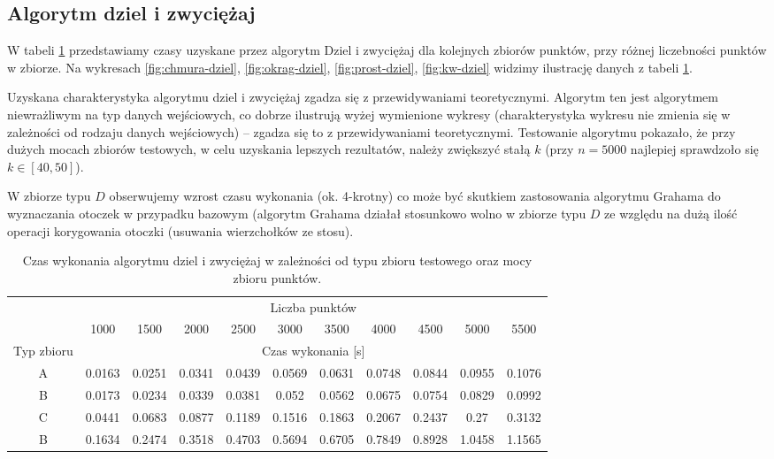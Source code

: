 \documentclass[11pt]{article}
\theoremstyle{remark} \newtheorem{definition}{def.}
\theoremstyle{definition} \newtheorem{twierdzenie}{tw.}
\begin{document}
\subsection{Algorytm dziel i zwyciężaj}

W tabeli \ref{tab:dziel} przedstawiamy czasy uzyskane przez algorytm Dziel i zwyciężaj dla kolejnych zbiorów punktów, przy różnej liczebności punktów w zbiorze. Na wykresach \ref{fig:chmura-dziel}, 
\ref{fig:okrag-dziel}, \ref{fig:prost-dziel}, \ref{fig:kw-dziel} widzimy ilustrację danych z tabeli \ref{tab:dziel}.


Uzyskana charakterystyka algorytmu dziel i zwyciężaj zgadza się z przewidywaniami teoretycznymi. Algorytm ten jest algorytmem niewrażliwym na typ danych wejściowych, co dobrze ilustrują wyżej wymienione wykresy 
(charakterystyka wykresu nie zmienia się w zależności od rodzaju danych wejściowych) -- zgadza się to z przewidywaniami teoretycznymi. Testowanie algorytmu pokazało, że przy dużych mocach zbiorów testowych, 
w celu uzyskania lepszych rezultatów, należy zwiększyć stałą $k$ (przy $n = 5000$ najlepiej sprawdzoło się $k \in [40, 50]$). 


W zbiorze typu $D$ obserwujemy wzrost czasu wykonania (ok. 4-krotny) co może być skutkiem zastosowania algorytmu Grahama do wyznaczania otoczek w przypadku bazowym (algorytm Grahama działał stosunkowo wolno 
w zbiorze typu $D$ ze względu na dużą ilość operacji korygowania otoczki (usuwania wierzchołków ze stosu).

\begin{table}[]
\centering
\caption{Czas wykonania algorytmu dziel i zwyciężaj w zależności od typu zbioru testowego oraz mocy zbioru punktów.}
\label{tab:dziel}
\begin{tabular}{c|c|c|c|c|c|c|c|c|c|c|}
\cline{2-11}
\multicolumn{1}{l|}{} & \multicolumn{10}{c|}{Liczba punktów} \\ \cline{2-11} 
\multicolumn{1}{l|}{} & 1000 & 1500 & 2000 & 2500 & 3000 & 3500 & 4000 & 4500 & 5000 & 5500 \\ \hline
\multicolumn{1}{|c|}{Typ zbioru} & \multicolumn{10}{c|}{Czas wykonania {[}s{]}} \\ \hline
\multicolumn{1}{|c|}{A} & 0.0163 & 0.0251 & 0.0341 & 0.0439 & 0.0569 & 0.0631 & 0.0748 & 0.0844 & 0.0955 & 0.1076 \\ \hline
\multicolumn{1}{|c|}{B} & 0.0173 & 0.0234 & 0.0339 & 0.0381 & 0.052 & 0.0562 & 0.0675 & 0.0754 & 0.0829 & 0.0992 \\ \hline
\multicolumn{1}{|c|}{C} & 0.0441 & 0.0683 & 0.0877 & 0.1189 & 0.1516 & 0.1863 & 0.2067 & 0.2437 & 0.27 & 0.3132 \\ \hline
\multicolumn{1}{|c|}{B} & 0.1634 & 0.2474 & 0.3518 & 0.4703 & 0.5694 & 0.6705 & 0.7849 & 0.8928 & 1.0458 & 1.1565 \\ \hline
\end{tabular}
\end{table}
\end{document}
